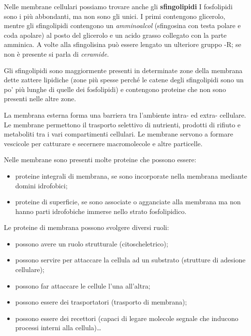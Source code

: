 \documentclass[]{article}
\begin{document}
Nelle membrane cellulari possiamo trovare anche gli
\textbf{sfingolipidi} I fosfolipidi sono i più abbondanti, ma non sono
gli unici. I primi contengono glicerolo, mentre gli sfingolipidi
contengono un \emph{amminoalcol} (sfingosina con testa polare e coda
apolare) al posto del glicerolo e un acido grasso collegato con la parte
amminica. A volte alla sfingolisina può essere lengato un ulteriore
gruppo -R; se non è presente si parla di \emph{ceramide}.

Gli sfingolipidi sono maggiormente presenti in determinate zone della
membrana dette zattere lipidiche (zone più spesse perché le catene degli
sfingolipidi sono un po' più lunghe di quelle dei fosfolipidi) e
contengono proteine che non sono presenti nelle altre zone.

La membrana esterna forma una barriera tra l'ambiente intra- ed extra-
cellulare. Le membrane permettono il trasporto selettivo di nutrienti,
prodotti di rifiuto e metaboliti tra i vari compartimenti cellulari. Le
membrane servono a formare vescicole per catturare e secernere
macromolecole e altre particelle.

Nelle membrane sono presenti molte proteine che possono essere:

\begin{itemize}
\itemsep1pt\parskip0pt
\item
  proteine integrali di membrana, se sono incorporate nella membrana
  mediante domini idrofobici;
\item
  proteine di superficie, se sono associate o agganciate alla membrana
  ma non hanno parti idrofobiche immerse nello strato fosfolipidico.
\end{itemize}

Le proteine di membrana possono svolgere diversi ruoli:

\begin{itemize}
\itemsep1pt\parskip0pt
\item
  possono avere un ruolo strutturale (citoscheletrico);
\item
  possono servire per attaccare la cellula ad un substrato (strutture di
  adesione cellulare);
\item
  possono far attaccare le cellule l'una all'altra;
\item
  possono essere dei trasportatori (trasporto di membrana);
\item
  possono essere dei recettori (capaci di legare molecole segnale che
  inducono processi interni alla cellula)\ldots{}
\end{itemize}
\end{document}
